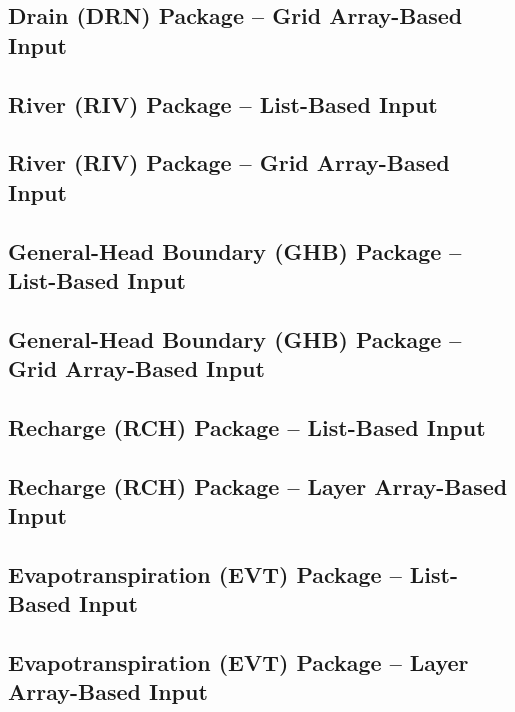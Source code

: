 \newpage
\subsection{Drain (DRN) Package -- Grid Array-Based Input}


\newpage
\subsection{River (RIV) Package -- List-Based Input}


\newpage
\subsection{River (RIV) Package -- Grid Array-Based Input}


\newpage
\subsection{General-Head Boundary (GHB) Package -- List-Based Input}


\newpage
\subsection{General-Head Boundary (GHB) Package -- Grid Array-Based Input}


\newpage
\subsection{Recharge (RCH) Package -- List-Based Input}


\newpage
\subsection{Recharge (RCH) Package -- Layer Array-Based Input}


\newpage
\subsection{Evapotranspiration (EVT) Package -- List-Based Input}


\newpage
\subsection{Evapotranspiration (EVT) Package -- Layer Array-Based Input}



